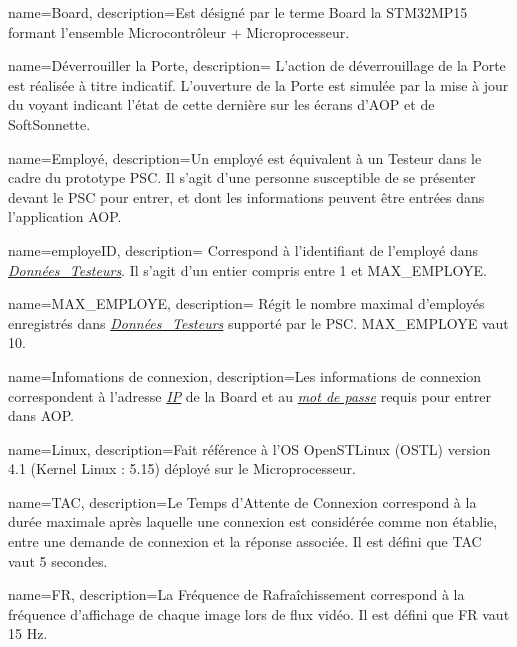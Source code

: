 {
    name={Board},
    description={\hypertarget{bd}{Est} désigné par le terme Board la STM32MP15 formant l'ensemble Microcontrôleur + Microprocesseur.}
}

{
    name={Déverrouiller la Porte},
    description={\hypertarget{deverrouiller}{} L'action de déverrouillage de la Porte est réalisée à titre indicatif. 
    L'ouverture de la Porte est simulée par la mise à jour du voyant indicant l'état de cette dernière sur les écrans d'AOP et de SoftSonnette.}
}

{
    name={Employé},
    description={\hypertarget{emp}{Un} employé est équivalent à un Testeur dans le cadre du prototype PSC.
    Il s'agit d'une personne susceptible de se présenter devant le PSC pour entrer, et dont les informations peuvent être entrées dans l'application AOP.}
}

{
    name={employeID},
    description={\hypertarget{idEmp}{} Correspond à l'identifiant de l'employé dans \hyperlink{donneesTesteurs}{\textit{Données\_Testeurs}}. 
    Il s'agit d'un entier compris entre 1 et MAX\_EMPLOYE.}
}

{
    name={MAX\_EMPLOYE},
    description={\hypertarget{maxEmployee}{} Régit le nombre maximal d'employés enregistrés dans \hyperlink{donneesTesteurs}{\textit{Données\_Testeurs}} supporté par le PSC. 
    MAX\_EMPLOYE vaut 10.}
}

{
    name={Infomations de connexion},
    description={\hypertarget{idc}{Les} informations de connexion correspondent à l'adresse \hyperlink{IP}{\textit{IP}} de la Board et au \hyperlink{mdp}{\textit{mot de passe}} requis pour entrer dans AOP.}
}

{
    name={Linux},
    description={\hypertarget{linux}{}Fait référence à l'OS OpenSTLinux (OSTL) version 4.1 (Kernel Linux : 5.15) déployé sur le Microprocesseur.}
}

{
    name={TAC},
    description={\hypertarget{tac}{}Le Temps d'Attente de Connexion correspond à la durée maximale après laquelle une connexion est considérée comme non établie, entre une demande de connexion et la réponse associée. 
    Il est défini que TAC vaut 5 secondes.}
}

{
    name={FR},
    description={\hypertarget{fr}{}La Fréquence de Rafraîchissement correspond à la fréquence d'affichage de chaque image lors de flux vidéo. 
    Il est défini que FR vaut 15 Hz.}
}

